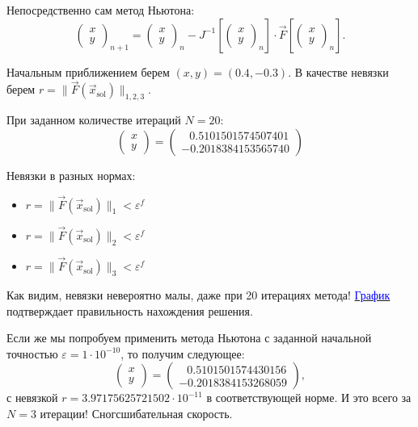 		Непосредственно сам метод Ньютона:
		\begin{equation*}
			\begin{pmatrix}
				x \\
				y
			\end{pmatrix}_{n+1} = 
			\begin{pmatrix}
				x \\
				y
			\end{pmatrix}_{n} - J^{-1}\left[\begin{pmatrix}
				x \\
				y
			\end{pmatrix}_{n}\right] \cdot \vec{F}\left[\begin{pmatrix}
				x \\
				y
			\end{pmatrix}_{n}\right].
		\end{equation*}
	
		Начальным приближением берем $(x, y) = (0.4, -0.3)$.
		В качестве невязки берем $r = \|\vec{F}(\vec{x}_\text{sol})\|_{1, 2, 3}$.
		
		При заданном количестве итераций $N = 20$:
		\begin{equation*}
			\begin{pmatrix}
				x \\
				y
			\end{pmatrix} = 
			\begin{pmatrix}
				\;\;\, 0.5101501574507401 \\
				-0.2018384153565740
			\end{pmatrix}
		\end{equation*}
	
		Невязки в разных нормах:
		\begin{itemize}
			\item $r = \|\vec{F}(\vec{x}_\text{sol})\|_{1} < \varepsilon^f$
			
			\item $r = \|\vec{F}(\vec{x}_\text{sol})\|_{2} < \varepsilon^f$
						
			\item $r = \|\vec{F}(\vec{x}_\text{sol})\|_{3} < \varepsilon^f$
		\end{itemize}
		
		Как видим, невязки невероятно малы, даже при 20 итерациях метода! \hyperref[System1]{\textcolor{blue}{График}} подтверждает правильность нахождения решения.
		
		Если же мы попробуем применить метода Ньютона с заданной начальной точностью $\varepsilon = 1 \cdot 10^{-10}$, то получим следующее:
		\begin{equation*}
			\begin{pmatrix}
				x \\
				y
			\end{pmatrix} = 
			\begin{pmatrix}
				\;\;\, 0.5101501574430156 \\
				-0.2018384153268059
			\end{pmatrix},
		\end{equation*}
		\noindent с невязкой $r = 3.97175625721502 \cdot 10^{-11}$ в соответствующей норме. И это всего за $N = 3$ итерации! Сногсшибательная скорость.
		
